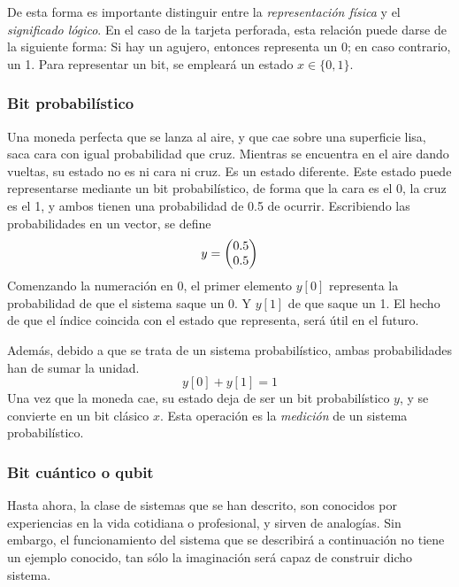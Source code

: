 De esta forma es importante distinguir entre la \textit{representación física} y 
el \textit{significado lógico}. En el caso de la tarjeta perforada, esta 
relación puede darse de la siguiente forma: Si hay un agujero, entonces 
representa un 0; en caso contrario, un 1. Para representar un bit, se empleará 
un estado $x \in \{0, 1\}$.


\subsubsection{Bit probabilístico}

Una moneda perfecta que se lanza al aire, y que cae sobre una superficie lisa, 
saca cara con igual probabilidad que cruz. Mientras se encuentra en el aire 
dando vueltas, su estado no es ni cara ni cruz. Es un estado diferente. Este 
estado puede representarse mediante un bit probabilístico, de forma que la cara 
es el 0, la cruz es el 1, y ambos tienen una probabilidad de 0.5 de ocurrir.  
Escribiendo las probabilidades en un vector, se define
%
$$ y = \begin{pmatrix} 0.5 \\ 0.5 \end{pmatrix} $$
%
Comenzando la numeración en 0, el primer elemento $y[0]$ representa la 
probabilidad de que el sistema saque un 0. Y $y[1]$ de que saque un 1. El hecho 
de que el índice coincida con el estado que representa, será útil en el futuro.

Además, debido a que se trata de un sistema probabilístico, ambas probabilidades 
han de sumar la unidad.
%
$$ y[0] + y[1] = 1 $$
%
Una vez que la moneda cae, su estado deja de ser un bit probabilístico $y$, y se 
convierte en un bit clásico $x$. Esta operación es la \textit{medición} de un 
sistema probabilístico.

\subsubsection{Bit cuántico o qubit}

Hasta ahora, la clase de sistemas que se han descrito, son conocidos por 
experiencias en la vida cotidiana o profesional, y sirven de analogías. Sin 
embargo, el funcionamiento del sistema que se describirá a continuación no tiene 
un ejemplo conocido, tan sólo la imaginación será capaz de construir dicho 
sistema.

